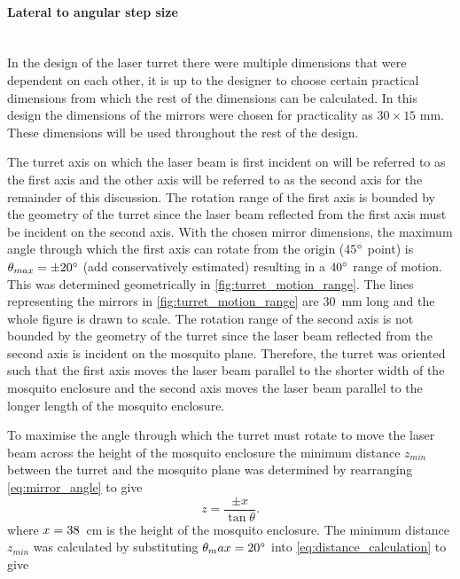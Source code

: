 \paragraph{Lateral to angular step size}\mbox{}\\
\label{par:lateral_to_angular_step_size}
In the design of the laser turret there were multiple dimensions that were dependent on each other, it is up to the designer to choose certain practical dimensions from which the rest of the dimensions can be calculated. In this design the dimensions of the mirrors were chosen for practicality as $30 \times 15$ mm. These dimensions will be used throughout the rest of the design.

The turret axis on which the laser beam is first incident on will be referred to as the first axis and the other axis will be referred to as the second axis for the remainder of this discussion. The rotation range of the first axis is bounded by the geometry of the turret since the laser beam reflected from the first axis must be incident on the second axis. With the chosen mirror dimensions, the maximum angle through which the first axis can rotate from the origin (45$^{\circ}$ point) is $\theta_{max} =\pm 20^{\circ}$ (add conservatively estimated) resulting in a $40^{\circ}$ range of motion. This was determined geometrically in \autoref{fig:turret_motion_range}. The lines representing the mirrors in \autoref{fig:turret_motion_range} are 30~mm long and the whole figure is drawn to scale. The rotation range of the second axis is not bounded by the geometry of the turret since the laser beam reflected from the second axis is incident on the mosquito plane. Therefore, the turret was oriented such that the first axis moves the laser beam parallel to the shorter width of the mosquito enclosure and the second axis moves the laser beam parallel to the longer length of the mosquito enclosure.

To maximise the angle through which the turret must rotate to move the laser beam across the height of the mosquito enclosure the minimum distance $z_{min}$ between the turret and the mosquito plane was determined by rearranging \autoref{eq:mirror_angle} to give
\begin{equation}
    z = \frac{\pm x}{\tan{\theta}}.
    \label{eq:distance_calculation}
\end{equation}
where $x = 38$~cm is the height of the mosquito enclosure. The minimum distance $z_{min}$ was calculated by substituting $\theta_max = 20^{\circ}$ into \autoref{eq:distance_calculation} to give

